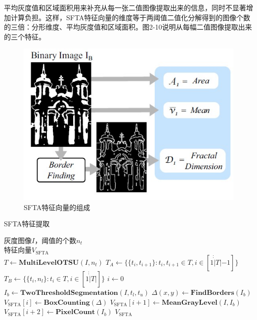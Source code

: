 \documentclass[supercite]{HustGraduPaper}
\begin{document}
\begin{sloppypar}
  平均灰度值和区域面积用来补充从每一张二值图像提取出来的信息，同时不显著增加计算负担。这样，SFTA特征向量的维度等于两阈值二值化分解得到的图像个数的三倍：分形维度、平均灰度值和区域面积。图2-10说明从每幅二值图像提取出来的三个特征。
  \begin{figure}[H]
    \setlength{\abovecaptionskip}{0.2cm}
    \setlength{\belowcaptionskip}{-0.cm}
      \centering%
      \includegraphics[scale=0.8]{13.jpg}
      \caption{SFTA特征向量的组成}
    \end{figure}
  \begin{algorithm}[H] 
    \caption{SFTA特征提取} 
    \label{alg:Framwork} 
    \begin{algorithmic}[1] %
    \REQUIRE  灰度图像$I$，阈值的个数$n_t$\\
    \ENSURE  特征向量$V_{\text{SFTA}}$\\
    \STATE $T\leftarrow \mathbf{MultiLevelOTSU}(I,n_t)$
    \STATE $T_A\leftarrow \{ \{ t_i,t_{i+1} \}:t_i,t_{i+1}\in T,i\in [1\dot\dot|T|-1] \}$
    \STATE $T_B\leftarrow \{ \{ t_i,n_l\}:t_i\in T,i\in [1\dot\dot |T|] \}$
    \STATE $i\leftarrow 0$
    \STATE  $I_b\leftarrow\mathbf{TwoThresholdSegmentation}(I,t_l,t_u)$
    \STATE  $\Delta(x,y)\leftarrow\mathbf{FindBorders}(I_b)$
    \STATE  $V_{\text{SFTA}}[i]\leftarrow\mathbf{BoxCounting}(\Delta)$
    \STATE  $V_{\text{SFTA}}[i+1]\leftarrow\mathbf{MeanGrayLevel}(I,I_b)$
    \STATE  $V_{\text{SFTA}}[i+2]\leftarrow\mathbf{PixelCount}(I_b)$
    \ENDFOR
    \RETURN $V_{\text{SFTA}}$
    \end{algorithmic}
  \end{algorithm}


\end{sloppypar}
\end{document}
